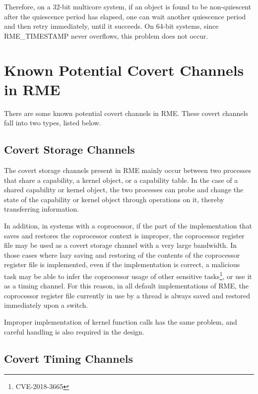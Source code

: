 Therefore, on a 32-bit multicore system, if an object is found to be non-quiescent after the quiescence period has elapsed, one can wait another quiescence period and then retry immediately, until it succeeds. On 64-bit systems, since RME\_TIMESTAMP never overflows, this problem does not occur.

\section{Known Potential Covert Channels in RME}\label{sec:9-known-covert-channels}

There are some known potential covert channels in RME. These covert channels fall into two types, listed below.

\subsection{Covert Storage Channels}\label{subsec:9-covert-storage-channel}

The covert storage channels present in RME mainly occur between two processes that share a capability, a kernel object, or a capability table. In the case of a shared capability or kernel object, the two processes can probe and change the state of the capability or kernel object through operations on it, thereby transferring information.

In addition, in systems with a coprocessor, if the part of the implementation that saves and restores the coprocessor context is improper, the coprocessor register file may be used as a covert storage channel with a very large bandwidth. In those cases where lazy saving and restoring of the contents of the coprocessor register file is implemented, even if the implementation is correct, a malicious task may be able to infer the coprocessor usage of other sensitive tasks\footnote{CVE-2018-3665}, or use it as a timing channel. For this reason, in all default implementations of RME, the coprocessor register file currently in use by a thread is always saved and restored immediately upon a switch.

Improper implementation of kernel function calls has the same problem, and careful handling is also required in the design.

\subsection{Covert Timing Channels}\label{subsec:9-covert-timing-channel}

